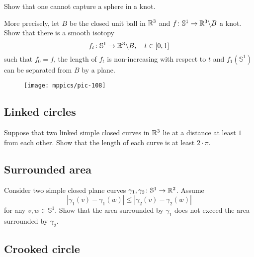 \begin{pr}
Show that one cannot capture a sphere in a knot.

More precisely, let $B$ be the closed unit ball in $\mathbb{R}^3$
and $f\:\mathbb{S}^1\z\to \RR^3\backslash B$ a knot.
Show that there is a smooth isotopy 
$$f_t\colon\mathbb{S}^1\to \mathbb{R}^3\backslash B,\ \ \ t\in [0,1]$$ 
such that $f_0=f$,
the length of $f_t$ is non-increasing with respect to $t$
and $f_1(\mathbb{S}^1)$ can be separated from $B$ by a plane.
\end{pr}

{

\begin{wrapfigure}{r}{20 mm}
\vskip2mm
\centering
\texttt{[image: mppics/pic-108]}
\end{wrapfigure}

\subsection*{Linked circles}
\label{linked-circles}

\begin{pr}
Suppose that two linked simple closed curves in $\mathbb{R}^3$
lie at a distance at least $1$ from each other.
Show that the length of each curve is at least $2\cdot\pi$.
\end{pr}

}

\subsection*{Surrounded area}
\label{Surrounded area}

\begin{pr}
Consider two simple closed plane curves 
$\gamma_1,\gamma_2\colon\mathbb S^1\to\mathbb{R}^2$.
Assume 
\[|\gamma_1(v)-\gamma_1(w)|\le|\gamma_2(v)-\gamma_2(w)|\]
for any $v,w\in \mathbb S^1$.
Show that the area surrounded by $\gamma_1$ does not exceed the area surrounded by $\gamma_2$. 
\end{pr}



\subsection*{Crooked circle}

\label{Crooked circle}

